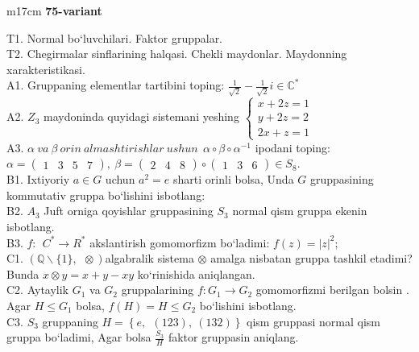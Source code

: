 \documentclass{article}
\begin{document}
\begin{tabular}{m{17cm}}
\textbf{75-variant}
\newline

T1. Normal bo`luvchilari. Faktor gruppalar. \\
T2. Chegirmalar sinflarining halqasi. Chekli maydonlar. Maydonning xarakteristikasi. \\
A1. Gruppaning elementlar tartibini toping: \(\frac{1}{\sqrt{2}} - \frac{1}{\sqrt{2}}i \in \mathbb{C}^{*}\) \\
A2. \(Z_{3}\) maydoninda quyidagi sistemani yeshing \(\left\{ \begin{matrix}
x + 2z = 1 \\
y + 2z = 2 \\
2x + z = 1
\end{matrix} \right.\ \) \\
A3. \(\alpha\ va\ \beta\ orin\ almashtirishlar\ ushun\ \ \alpha \circ \beta \circ \alpha^{- 1}\) ipodani toping:\(\alpha = \begin{pmatrix}
1 & 3 & 5 & 7
\end{pmatrix},\ \beta = \begin{pmatrix}
2 & 4 & 8
\end{pmatrix} \circ \begin{pmatrix}
1 & 3 & 6
\end{pmatrix} \in S_{8}\). \\
B1. Ixtiyoriy \(a \in G\) uchun \(a^{2} = e\) sharti orinli bolsa, Unda \(G\) gruppasining kommutativ gruppa bo`lishini isbotlang: \\
B2. \(A_{3}\) Juft orniga qoyishlar gruppasining \(S_{3}\) normal qism gruppa ekenin isbotlang. \\
B3. \(f:\ \ C^{*} \rightarrow R^{*}\) akslantirish gomomorfizm bo`ladimi: \(f(z) = |z|^{2};\) \\
C1. \(\left( \mathbb{Q}\backslash\{ 1\},\ \  \otimes \right)\)algabralik sistema \(\otimes\) amalga nisbatan gruppa tashkil etadimi? Bunda \(x \otimes y = x + y - xy\) ko`rinishida aniqlangan. \\
C2. Aytaylik \(G_{1}\) va \(G_{2}\) gruppalarining \(f:G_{1} \rightarrow G_{2}\) gomomorfizmi berilgan bo\textquotesingle lsin . Agar \(H \leq G_{1}\) bolsa, \(f(H) = H \leq G_{2}\) bo`lishini isbotlang. \\
C3. \(S_{3}\) gruppaning \(H = \left\{ e,\ \ (123),\ (132) \right\}\) qism gruppasi normal qism gruppa bo`ladimi, Agar bolsa \(\frac{S_{3}}{H}\) faktor gruppasin aniqlang. \\

\end{tabular}
\vspace{1cm}
\end{document}
